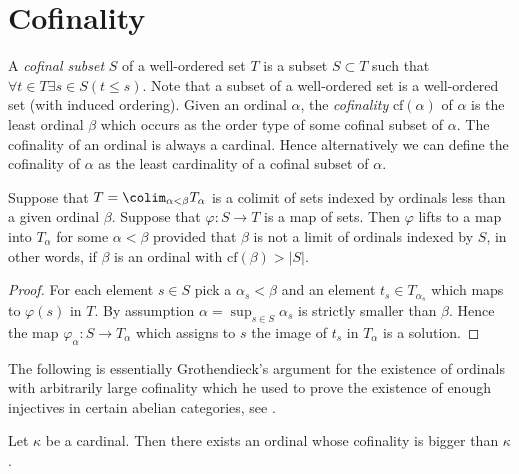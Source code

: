 \section{Cofinality}
\label{section-cofinality}

\noindent
A {\it cofinal subset} $S$ of a well-ordered set $T$ is a subset
$S \subset T$ such that $\forall t \in T \exists s\in S (t \leq s)$.
Note that a subset of a well-ordered set is a well-ordered set
(with induced ordering). Given an ordinal $\alpha$, the {\it cofinality}
$\text{cf}(\alpha)$ of $\alpha$ is the least ordinal $\beta$
which occurs as the order type of some cofinal subset of $\alpha$.
The cofinality of an ordinal is always a cardinal.
Hence alternatively we can define the cofinality of
$\alpha$ as the least cardinality of a cofinal subset of $\alpha$.

\begin{lemma}
\label{lemma-map-from-set-lifts}
Suppose that $T = \colim_{\alpha < \beta} T_\alpha$
is a colimit of sets indexed by ordinals less than a given ordinal $\beta$.
Suppose that $\varphi : S \to T$ is a map of sets.
Then $\varphi$ lifts to a map into $T_\alpha$ for some $\alpha < \beta$
provided that $\beta$ is not a limit of ordinals indexed by $S$,
in other words, if $\beta$ is an ordinal with $\text{cf}(\beta) > |S|$.
\end{lemma}

\begin{proof}
For each element $s \in S$ pick a $\alpha_s < \beta$ and an element
$t_s \in T_{\alpha_s}$ which maps to $\varphi(s)$ in $T$.
By assumption $\alpha = \sup_{s \in S} \alpha_s$ is strictly smaller
than $\beta$. Hence the map $\varphi_\alpha : S \to T_\alpha$
which assigns to $s$ the image of $t_s$ in $T_\alpha$ is a solution.
\end{proof}

\noindent
The following is essentially Grothendieck's argument for the existence
of ordinals with arbitrarily large cofinality which he used to prove
the existence of enough injectives in certain abelian categories, see
\cite{Tohoku}.

\begin{proposition}
\label{proposition-exist-ordinals-large-cofinality}
Let $\kappa$ be a cardinal. Then there exists an ordinal
whose cofinality is bigger than $\kappa$.
\end{proposition}

